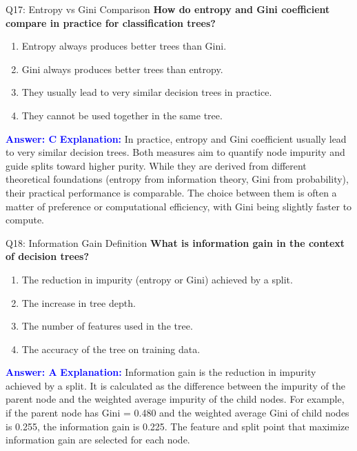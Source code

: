 \documentclass[8pt]{beamer}
\begin{document}
	\begin{frame}{Q17: Entropy vs Gini Comparison}
		\fontsize{6.5}{7.5}\selectfont
		\textbf{How do entropy and Gini coefficient compare in practice for classification trees?}
		\begin{enumerate}
			\item Entropy always produces better trees than Gini.
			\item Gini always produces better trees than entropy.
			\item They usually lead to very similar decision trees in practice.
			\item They cannot be used together in the same tree.
		\end{enumerate}
		\vspace{0.1cm}
		\textcolor{blue}{\textbf{Answer: C}}
		\vspace{0.1cm}
		\textcolor{blue}{\textbf{Explanation:}} In practice, entropy and Gini coefficient usually lead to very similar decision trees. Both measures aim to quantify node impurity and guide splits toward higher purity. While they are derived from different theoretical foundations (entropy from information theory, Gini from probability), their practical performance is comparable. The choice between them is often a matter of preference or computational efficiency, with Gini being slightly faster to compute.
	\end{frame}
	
	\begin{frame}{Q18: Information Gain Definition}
		\fontsize{6.5}{7.5}\selectfont
		\textbf{What is information gain in the context of decision trees?}
		\begin{enumerate}
			\item The reduction in impurity (entropy or Gini) achieved by a split.
			\item The increase in tree depth.
			\item The number of features used in the tree.
			\item The accuracy of the tree on training data.
		\end{enumerate}
		\vspace{0.1cm}
		\textcolor{blue}{\textbf{Answer: A}}
		\vspace{0.1cm}
		\textcolor{blue}{\textbf{Explanation:}} Information gain is the reduction in impurity achieved by a split. It is calculated as the difference between the impurity of the parent node and the weighted average impurity of the child nodes. For example, if the parent node has Gini = 0.480 and the weighted average Gini of child nodes is 0.255, the information gain is 0.225. The feature and split point that maximize information gain are selected for each node.
	\end{frame}
	
\end{document}
